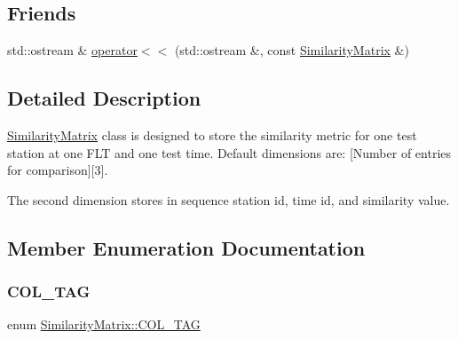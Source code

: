 \subsection*{Friends}
\begin{DoxyCompactItemize}
\item 
std\+::ostream \& \mbox{\hyperlink{class_similarity_matrix_a4f66865bdf5054bd8b5840030674e397}{operator$<$$<$}} (std\+::ostream \&, const \mbox{\hyperlink{class_similarity_matrix}{Similarity\+Matrix}} \&)
\end{DoxyCompactItemize}


\subsection{Detailed Description}
\mbox{\hyperlink{class_similarity_matrix}{Similarity\+Matrix}} class is designed to store the similarity metric for one test station at one F\+LT and one test time. Default dimensions are\+: \mbox{[}Number of entries for comparison\mbox{]}\mbox{[}3\mbox{]}. 

The second dimension stores in sequence station id, time id, and similarity value. 

\subsection{Member Enumeration Documentation}
\mbox{\label{class_similarity_matrix_a79098014d74c2cf85f0dd8ad7fc4ac4f}} 
\subsubsection{\texorpdfstring{C\+O\+L\+\_\+\+T\+AG}{COL\_TAG}}
{\footnotesize\ttfamily enum \mbox{\hyperlink{class_similarity_matrix_a79098014d74c2cf85f0dd8ad7fc4ac4f}{Similarity\+Matrix\+::\+C\+O\+L\+\_\+\+T\+AG}}}

